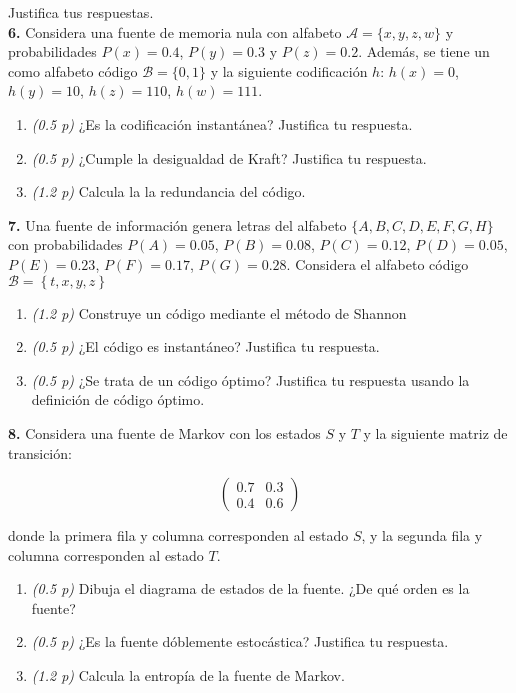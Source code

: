 \documentclass{article}
\begin{document}
Justifica tus respuestas.\\

\textbf{6.} Considera una fuente de memoria nula con alfabeto \(\mathcal{A} = \{x, y, z, w\}\) y probabilidades \(P(x) = 0.4\), \(P(y) = 0.3\) y \(P(z) = 0.2\). Además, se tiene un como alfabeto código \(\mathcal{B} = \{0, 1\}\) y la siguiente codificación \(h\): \(h(x) = 0\), \(h(y) = 10\), \(h(z) = 110\), \(h(w) = 111\).

\begin{enumerate}
    \item \textit{(0.5 p)} ¿Es la codificación instantánea? Justifica tu respuesta.
    \item \textit{(0.5 p)} ¿Cumple la desigualdad de Kraft? Justifica tu respuesta.
    \item \textit{(1.2 p)} Calcula la la redundancia del código.
\end{enumerate}

\textbf{7.} Una fuente de información genera letras del alfabeto \(\{A, B, C, D, E, F, G, H\}\) con probabilidades \(P(A) = 0.05\), \(P(B) = 0.08\), \(P(C) = 0.12\), \(P(D) = 0.05\), \(P(E) = 0.23\), \(P(F) = 0.17\), \(P(G) = 0.28\). Considera el alfabeto código \(\mathcal{B} =\left\{t,x,y,z\right\}\)

\begin{enumerate}
    \item \textit{(1.2 p)} Construye un código mediante el método de Shannon
    \item \textit{(0.5 p)} ¿El código es instantáneo? Justifica tu respuesta.
    \item \textit{(0.5 p)} ¿Se trata de un código óptimo? Justifica tu respuesta usando la definición de código óptimo.
\end{enumerate}

\textbf{8.} Considera una fuente de Markov con los estados \(S\) y \(T\) y la siguiente matriz de transición:

\[
\begin{pmatrix}
0.7 & 0.3 \\
0.4 & 0.6
\end{pmatrix}
\]

donde la primera fila y columna corresponden al estado \(S\), y la segunda fila y columna corresponden al estado \(T\).

\begin{enumerate}
    \item \textit{(0.5 p)} Dibuja el diagrama de estados de la fuente. ¿De qué orden es la fuente?
    \item \textit{(0.5 p)} ¿Es la fuente dóblemente estocástica? Justifica tu respuesta.
    \item \textit{(1.2 p)} Calcula la entropía de la fuente de Markov.
\end{enumerate}
\end{document}
